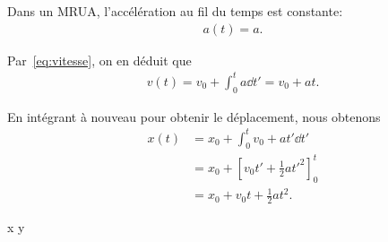 \documentclass[main.tex]{subfiles}
\begin{document}
\begin{example}

    Dans un MRUA,
    l'accélération au fil du temps est constante:
    \begin{align}
        a(t) = a.
    \end{align}

    Par~\eqref{eq:vitesse},
    on en déduit que
    \begin{align}
        v(t) = v_0 + \int_0^t a \dd t' = v_0 + a t.
    \end{align}

    En intégrant à nouveau pour obtenir le déplacement,
    nous obtenons
    \begin{align}
        x(t) &= x_0 + \int_0^t v_0 + at' \dd t'\\
             &= x_0 + \left[v_0 t' + \frac 1 2 a t'^2 \right]^t_0\\
             &= x_0 + v_0 t + \frac 1 2 a t^2.
    \end{align}
\end{example}

 x y
\end{document}
